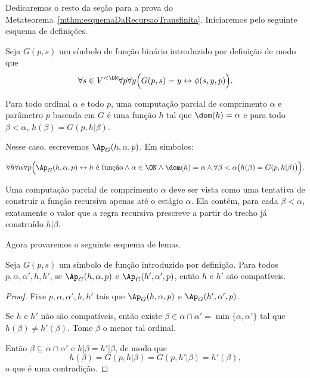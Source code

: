 Dedicaremos o resto da seção para a prova do Metateorema~\ref{mthm:esquemaDaRecursaoTransfinita}.
Iniciaremos pelo seguinte esquema de definições.
\begin{definition}[$\BST$]\label{def:computacaoParcialTransfinita}
    Seja $G(p, s)$ um símbolo de função binário introduzido por definição de modo que
    \[
        \forall s \in V^{<\ON}\forall p\forall y
        \Bigl(G(p,s)=y \leftrightarrow \phi(s,y,p)\Bigr).
    \]

    Para todo ordinal $\alpha$ e todo $p$, uma computação parcial de comprimento $\alpha$ e parâmetro $p$ baseada em $G$ é uma função $h$ tal que $\dom(h)=\alpha$ e para todo $\beta <\alpha$, $h(\beta)=G(p, h|\beta)$.
    
    Nesse caso, escrevemos $\Ap_G(h, \alpha, p)$.
    Em símbolos:

    \[
        \forall h\forall \alpha\forall p
        \Bigl(\Ap_G(h,\alpha,p) \leftrightarrow
        h \text{ é função} \land \alpha\in\ON \land \dom(h)=\alpha \land
        \forall \beta<\alpha\bigl(h(\beta)=G(p,h|\beta)\bigr)\Bigr).
    \]
\end{definition}
Uma computação parcial de comprimento $\alpha$ deve ser vista como uma tentativa de construir a função recursiva apenas até o estágio $\alpha$.
Ela contém, para cada $\beta<\alpha$, exatamente o valor que a regra recursiva prescreve a partir do trecho já construído $h|\beta$.


Agora provaremos o seguinte esquema de lemas.
\begin{lemma}[$\BST$]\label{lem:compatibilidadeDeComputacoesParciais}
    Seja $G(p, s)$ um símbolo de função introduzido por definição.
    Para todos $p, \alpha, \alpha', h, h'$, se $\Ap_G(h, \alpha, p)$ e $\Ap_G(h', \alpha', p)$, então $h$ e $h'$ são compatíveis.
\end{lemma}
\begin{proof}
    Fixe $p, \alpha, \alpha', h, h'$ tais que $\Ap_G(h, \alpha, p)$ e $\Ap_G(h', \alpha', p)$.

    Se $h$ e $h'$ não são compatíveis, então existe $\beta\in \alpha\cap \alpha'=\min\{\alpha, \alpha'\}$ tal que $h(\beta)\neq h'(\beta)$.
    Tome $\beta$ o menor tal ordinal.

    Então $\beta\subseteq \alpha\cap \alpha'$ e $h|\beta=h'|\beta$, de modo que
    \[
        h(\beta)=G(p, h|\beta)=G(p, h'|\beta)=h'(\beta),
    \]
    o que é uma contradição.
\end{proof}

